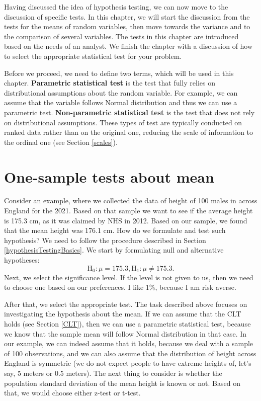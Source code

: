 \documentclass[
]{book}
\theoremstyle{definition}
\theoremstyle{definition}
\theoremstyle{definition}
\theoremstyle{definition}
\theoremstyle{remark}
\begin{document}
Having discussed the idea of hypothesis testing, we can now move to the discussion of specific tests. In this chapter, we will start the discussion from the tests for the means of random variables, then move towards the variance and to the comparison of several variables. The tests in this chapter are introduced based on the needs of an analyst. We finish the chapter with a discussion of how to select the appropriate statistical test for your problem.

Before we proceed, we need to define two terms, which will be used in this chapter. \textbf{Parametric statistical test} is the test that fully relies on distributional assumptions about the random variable. For example, we can assume that the variable follows Normal distribution and thus we can use a parametric test. \textbf{Non-parametric statistical test} is the test that does not rely on distributional assumptions. These types of test are typically conducted on ranked data rather than on the original one, reducing the scale of information to the ordinal one (see Section \ref{scales}).

\hypertarget{statisticalTestsOneSampleMean}{%
\section{One-sample tests about mean}\label{statisticalTestsOneSampleMean}}

Consider an example, where we collected the data of height of 100 males in across England for the 2021. Based on that sample we want to see if the average height is 175.3 cm, as it was claimed by NHS in 2012. Based on our sample, we found that the mean height was 176.1 cm. How do we formulate and test such hypothesis? We need to follow the procedure described in Section \ref{hypothesisTestingBasics}. We start by formulating null and alternative hypotheses:
\begin{equation*}
    \mathrm{H}_0: \mu = 175.3, \mathrm{H}_1: \mu \neq 175.3 .
\end{equation*}
Next, we select the significance level. If the level is not given to us, then we need to choose one based on our preferences. I like 1\%, because I am risk averse.

After that, we select the appropriate test. The task described above focuses on investigating the hypothesis about the mean. If we can assume that the CLT holds (see Section \ref{CLT}), then we can use a parametric statistical test, because we know that the sample mean will follow Normal distribution in that case. In our example, we can indeed assume that it holds, because we deal with a sample of 100 observations, and we can also assume that the distribution of height across England is symmetric (we do not expect people to have extreme heights of, let's say, 5 meters or 0.5 meters). The next thing to consider is whether the population standard deviation of the mean height is known or not. Based on that, we would choose either z-test or t-test.
\end{document}
